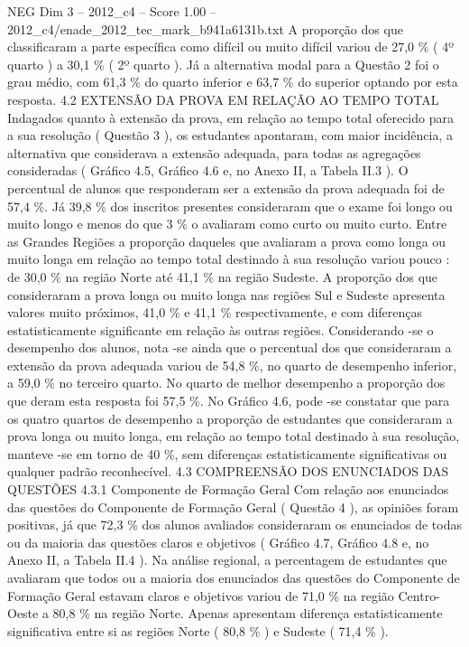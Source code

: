 \begin{textsample}{NEG Dim 3 – 2012\_c4 – Score 1.00 – 2012\_c4/enade\_2012\_tec\_mark\_b941a6131b.txt}
A proporção dos que classificaram a parte específica como difícil ou muito difícil variou de 27,0 \% ( 4º quarto ) a 30,1 \% ( 2º quarto ).
Já a alternativa modal para a Questão 2 foi o grau médio, com 61,3 \% do quarto inferior e 63,7 \% do superior optando por esta resposta. 4.2 EXTENSÃO DA PROVA EM RELAÇÃO AO TEMPO TOTAL Indagados quanto à extensão da prova, em relação ao tempo total oferecido para a sua resolução ( Questão 3 ), os estudantes apontaram, com maior incidência, a alternativa que considerava a extensão adequada, para todas as agregações consideradas ( Gráfico 4.5, Gráfico 4.6 e, no Anexo II, a Tabela II.3 ).
O percentual de alunos que responderam ser a extensão da prova adequada foi de 57,4 \%.
Já 39,8 \% dos inscritos presentes consideraram que o exame foi longo ou muito longo e menos do que 3 \% o avaliaram como curto ou muito curto.
Entre as Grandes Regiões a proporção daqueles que avaliaram a prova como longa ou muito longa em relação ao tempo total destinado à sua resolução variou pouco : de 30,0 \% na região Norte até 41,1 \% na região Sudeste.
A proporção dos que consideraram a prova longa ou muito longa nas regiões Sul e Sudeste apresenta valores muito próximos, 41,0 \% e 41,1 \% respectivamente, e com diferenças estatisticamente significante em relação às outras regiões.
Considerando -se o desempenho dos alunos, nota -se ainda que o percentual dos que consideraram a extensão da prova adequada variou de 54,8 \%, no quarto de desempenho inferior, a 59,0 \% no terceiro quarto.
No quarto de melhor desempenho a proporção dos que deram esta resposta foi 57,5 \%.
No Gráfico 4.6, pode -se constatar que para os quatro quartos de desempenho a proporção de estudantes que consideraram a prova longa ou muito longa, em relação ao tempo total destinado à sua resolução, manteve -se em torno de 40 \%, sem diferenças estatisticamente significativas ou qualquer padrão reconhecível. 4.3 COMPREENSÃO DOS ENUNCIADOS DAS QUESTÕES 4.3.1 Componente de Formação Geral Com relação aos enunciados das questões do Componente de Formação Geral ( Questão 4 ), as opiniões foram positivas, já que 72,3 \% dos alunos avaliados consideraram os enunciados de todas ou da maioria das questões claros e objetivos ( Gráfico 4.7, Gráfico 4.8 e, no Anexo II, a Tabela II.4 ).
Na análise regional, a percentagem de estudantes que avaliaram que todos ou a maioria dos enunciados das questões do Componente de Formação Geral estavam claros e objetivos variou de 71,0 \% na região Centro-Oeste a 80,8 \% na região Norte.
Apenas apresentam diferença estatisticamente significativa entre si as regiões Norte ( 80,8 \% ) e Sudeste ( 71,4 \% ).

\end{textsample}

